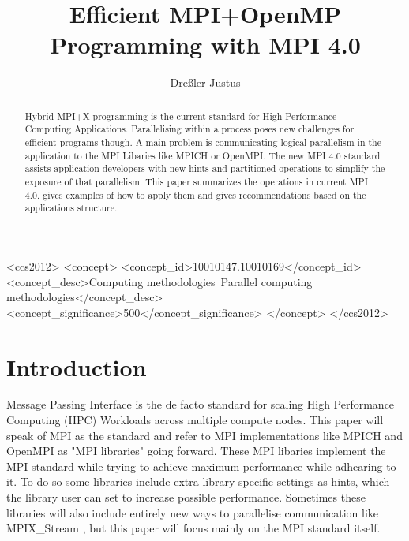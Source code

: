 \documentclass[sigconf]{acmart}
\begin{document}
\title{Efficient MPI+OpenMP Programming with MPI 4.0}
\author{Dreßler Justus}


\begin{CCSXML}
    <ccs2012>
    <concept>
    <concept_id>10010147.10010169</concept_id>
    <concept_desc>Computing methodologies~Parallel computing methodologies</concept_desc>
    <concept_significance>500</concept_significance>
    </concept>
    </ccs2012>
\end{CCSXML}


\begin{abstract}

    Hybrid MPI+X programming is the current standard for High Performance Computing Applications.
    Parallelising within a process poses new challenges for efficient programs though.
    A main problem is communicating logical parallelism in the application to the MPI Libaries like MPICH or OpenMPI.
    The new MPI 4.0 standard assists application developers with new hints and partitioned operations to simplify the exposure of that parallelism.
    This paper summarizes the operations in current MPI 4.0, gives examples of how to apply them and gives recommendations based on the applications structure.


\end{abstract}

\maketitle

\section{Introduction}

Message Passing Interface is the de facto standard for scaling High Performance Computing (HPC) Workloads across multiple compute nodes.
This paper will speak of MPI as the standard and refer to MPI implementations like MPICH and OpenMPI as "MPI libraries" going forward.
These MPI libaries implement the MPI standard while trying to achieve maximum performance while adhearing to it.
To do so some libraries include extra library specific settings as hints, which the library user can set to increase possible performance.
Sometimes these libraries will also include entirely new ways to parallelise communication like MPIX\_Stream \cite{Zhou2022}, but this paper will focus mainly on the MPI standard itself.
\end{document}
